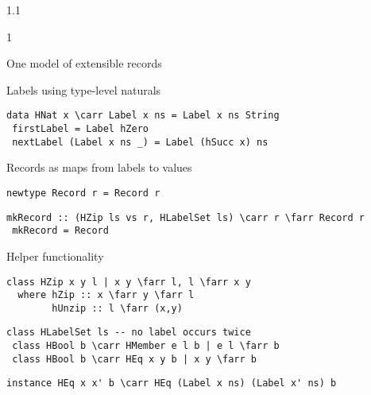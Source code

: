 \documentclass{slides}
\newenvironment{myslide}{\begin{slide}\color{Blue}\begin{boxedminipage}{1.1\hsize}\begin{boxedminipage}{1\hsize}\color{Black}
\vspace{-170\in}
}{%
\smallskip
\end{boxedminipage}
\end{boxedminipage}
\end{slide}}
\newenvironment{myslide}{\begin{slide}
}{%
\end{slide}}
\newenvironment{myslide}{\begin{slide}\color{White}\begin{boxedminipage}{1.1\hsize}\color{Black}
\vspace{-170\in}
}{%
\smallskip
\end{boxedminipage}
\end{slide}}
\newcommand{\header}[1]{{\large \color{Red} #1}}
\newcommand{\blau}[1]{{\vspace{-50\in}\normalsize \color{Blue} #1}}
\newcommand{\farr}{\ensuremath{\to}}
\newcommand{\carr}{\ensuremath{\Rightarrow}}
\begin{document}
\begin{myslide}

\header{One model of extensible records}

\vspace{-77\in}

\blau{Labels using type-level naturals}

\smallskip

\begin{Verbatim}[fontfamily=courier,fontsize=\tiny,commandchars=\\\{\}]
 data HNat x \carr Label x ns = Label x ns String
 firstLabel = Label hZero
 nextLabel (Label x ns _) = Label (hSucc x) ns
\end{Verbatim}

\vspace{-77\in}

\blau{Records as maps from labels to values}

\smallskip

\begin{Verbatim}[fontfamily=courier,fontsize=\tiny,commandchars=\\\{\}]
 newtype Record r = Record r
\end{Verbatim}

\smallskip

\begin{Verbatim}[fontfamily=courier,fontsize=\tiny,commandchars=\\\{\}]
 mkRecord :: (HZip ls vs r, HLabelSet ls) \carr r \farr Record r
 mkRecord = Record
\end{Verbatim}

\vspace{-77\in}

\blau{Helper functionality}

\smallskip

\begin{Verbatim}[fontfamily=courier,fontsize=\tiny,commandchars=\\\!\?]
 class HZip x y l | x y \farr l, l \farr x y
  where hZip :: x \farr y \farr l
        hUnzip :: l \farr (x,y)
\end{Verbatim}

\smallskip

\begin{Verbatim}[fontfamily=courier,fontsize=\tiny,commandchars=\\\{\}]
 class HLabelSet ls -- no label occurs twice
 class HBool b \carr HMember e l b | e l \farr b
 class HBool b \carr HEq x y b | x y \farr b
\end{Verbatim}

\smallskip

\begin{Verbatim}[fontfamily=courier,fontsize=\tiny,commandchars=\\\{\}]
 instance HEq x x' b \carr HEq (Label x ns) (Label x' ns) b
\end{Verbatim}

\end{myslide}
\end{document}
